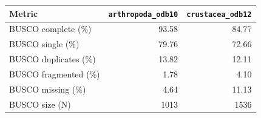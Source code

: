 \begin{table}[ht]
    \centering
    \begin{tabular}{lrr}
        \toprule
        Metric &
            \texttt{arthropoda\_odb10} &
            \texttt{crustacea\_odb12} \\
        \midrule
        \textsc{BUSCO} complete (\%)   & 93.58      & 84.77 \\
        \textsc{BUSCO} single (\%)     & 79.76      & 72.66 \\
        \textsc{BUSCO} duplicates (\%) & 13.82      & 12.11 \\
        \textsc{BUSCO} fragmented (\%) & 1.78       & 4.10 \\
        \textsc{BUSCO} missing (\%)    & 4.64       & 11.13 \\
        \textsc{BUSCO} size (N)        & \num{1013} & \num{1536} \\
        \bottomrule
    \end{tabular}
    \label{tab:sup_annot_stats}
\end{table}


